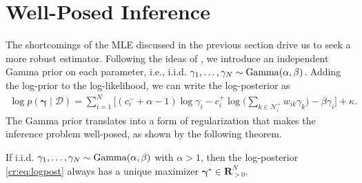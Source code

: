 \section{Well-Posed Inference} %
\label{cr:sec:inference}

The shortcomings of the MLE discussed in the previous section drive us to seek a more robust estimator.
Following the ideas of \citet{caron2012efficient}, we introduce an independent Gamma prior on each parameter, i.e., i.i.d. $\gamma_1, \ldots, \gamma_N \sim \mathrm{Gamma}( \alpha, \beta )$.
Adding the log-prior to the log-likelihood, we can write the log-posterior as
\begin{align}
\label{cr:eq:logpost}
\log p(\bm{\gamma} \mid \mathcal{D}) =
    \sum_{i = 1}^N \bigg[ (c^-_i + \alpha - 1) \log \gamma_i
        - c^+_i \log \bigg( \sum_{k \in \mathcal{N}^+_i} w_{ik} \gamma_k \bigg)  - \beta \gamma_i \bigg]
    + \kappa.
\end{align}
The Gamma prior translates into a form of regularization that makes the inference problem well-posed, as shown by the following theorem.

\begin{theorem}
\label{cr:thm:map}
If i.i.d. $\gamma_1, \ldots, \gamma_N \sim \mathrm{Gamma}( \alpha, \beta )$ with $\alpha > 1$, then the log-posterior \eqref{cr:eq:logpost} always has a unique maximizer $\bm{\gamma}^\star \in \mathbf{R}^N_{>0}$.
\end{theorem}

